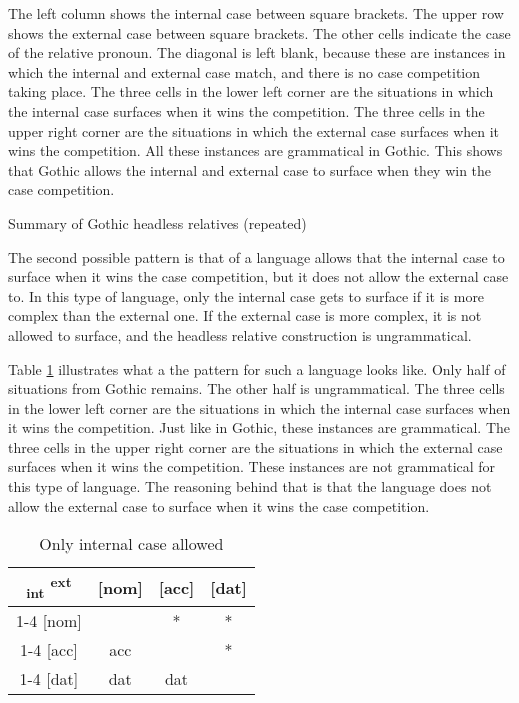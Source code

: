 The left column shows the internal case between square brackets. The upper row shows the external case between square brackets. The other cells indicate the case of the relative pronoun. The diagonal is left blank, because these are instances in which the internal and external case match, and there is no case competition taking place.
The three cells in the lower left corner are the situations in which the internal case surfaces when it wins the competition. The three cells in the upper right corner are the situations in which the external case surfaces when it wins the competition. All these instances are grammatical in Gothic.
This shows that Gothic allows the internal and external case to surface when they win the case competition.

\begin{table}[H]
  \center
  \caption{Summary of Gothic headless relatives (repeated)}
    
    \label{tbl:summary-gothic-repeated}
\end{table}

The second possible pattern is that of a language allows that the internal case to surface when it wins the case competition, but it does not allow the external case to. In this type of language, only the internal case gets to surface if it is more complex than the external one. If the external case is more complex, it is not allowed to surface, and the headless relative construction is ungrammatical.

Table \ref{tbl:case-competition-only-int} illustrates what a the pattern for such a language looks like. Only half of situations from Gothic remains. The other half is ungrammatical.
The three cells in the lower left corner are the situations in which the internal case surfaces when it wins the competition. Just like in Gothic, these instances are grammatical.
The three cells in the upper right corner are the situations in which the external case surfaces when it wins the competition. These instances are not grammatical for this type of language. The reasoning behind that is that the language does not allow the external case to surface when it wins the case competition.

\begin{table}[H]
  \center
  \caption{Only internal case allowed}
  \begin{tabular}{c|c|c|c}
    \toprule
    \textsubscript{\ac{int}} \textsuperscript{\ac{ext}}
           & [\ac{nom}]
           & [\ac{acc}]
           & [\ac{dat}]
           \\ \cmidrule{1-4}
       [\ac{nom}]
           &
           & *
           & *
           \\ \cmidrule{1-4}
       [\ac{acc}]
           & \ac{acc}
           &
           & *
           \\ \cmidrule{1-4}
       [\ac{dat}]
           & \ac{dat}
           & \ac{dat}
           &
           \\
     \bottomrule
  \end{tabular}
    \label{tbl:case-competition-only-int}
\end{table}

